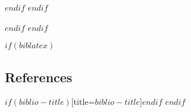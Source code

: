 \documentclass[final]{beamer}
\begin{document}
\begin{frame}[t]
\begin{multicols}{3}
\renewcommand\refname{$biblio-title$}
$endif$
$endif$


$endif$
$endif$

$if(biblatex)$
\subsection{References}

\printbibliography$if(biblio-title)$[title=$biblio-title$]$endif$
$endif$


\end{multicols}

\end{frame}
\end{document}

